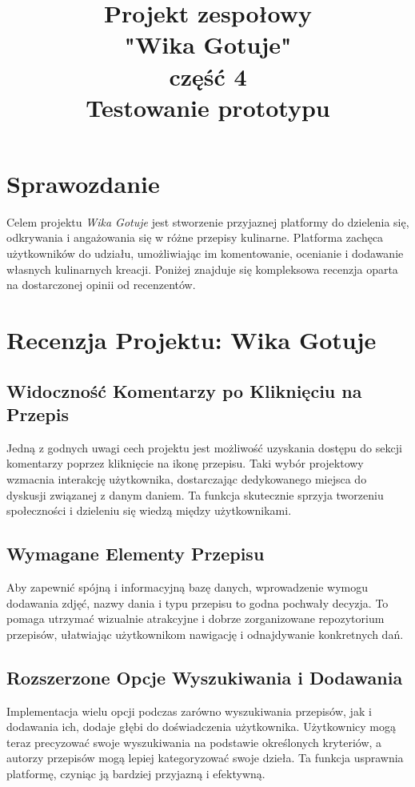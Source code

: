 \documentclass{article}
\title{\fontsize{20}{22}\selectfont Projekt zespołowy\\ "Wika Gotuje" \\ część 4\\Testowanie prototypu}
\begin{document}
\maketitle
\section{Sprawozdanie}
Celem projektu \textit{Wika Gotuje} jest stworzenie przyjaznej platformy do dzielenia się, odkrywania i angażowania się w różne przepisy kulinarne. Platforma zachęca użytkowników do udziału, umożliwiając im komentowanie, ocenianie i dodawanie własnych kulinarnych kreacji. Poniżej znajduje się kompleksowa recenzja oparta na dostarczonej opinii od recenzentów.

\section{Recenzja Projektu: Wika Gotuje}
\subsection{Widoczność Komentarzy po Kliknięciu na Przepis}
    Jedną z godnych uwagi cech projektu jest możliwość uzyskania dostępu do sekcji komentarzy poprzez kliknięcie na ikonę przepisu. Taki wybór projektowy wzmacnia interakcję użytkownika, dostarczając dedykowanego miejsca do dyskusji związanej z danym daniem. Ta funkcja skutecznie sprzyja tworzeniu społeczności i dzieleniu się wiedzą między użytkownikami.
\subsection{Wymagane Elementy Przepisu}
  Aby zapewnić spójną i informacyjną bazę danych, wprowadzenie wymogu dodawania zdjęć, nazwy dania i typu przepisu to godna pochwały decyzja. To pomaga utrzymać wizualnie atrakcyjne i dobrze zorganizowane repozytorium przepisów, ułatwiając użytkownikom nawigację i odnajdywanie konkretnych dań.
\subsection{Rozszerzone Opcje Wyszukiwania i Dodawania}
  Implementacja wielu opcji podczas zarówno wyszukiwania przepisów, jak i dodawania ich, dodaje głębi do doświadczenia użytkownika. Użytkownicy mogą teraz precyzować swoje wyszukiwania na podstawie określonych kryteriów, a autorzy przepisów mogą lepiej kategoryzować swoje dzieła. Ta funkcja usprawnia platformę, czyniąc ją bardziej przyjazną i efektywną.
\end{document}
